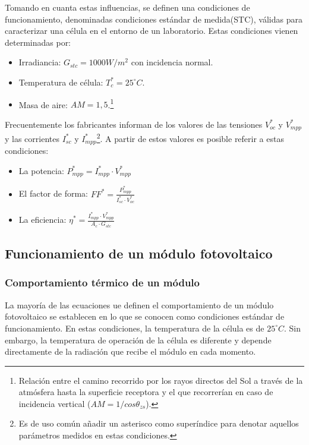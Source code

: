 Tomando en cuanta estas influencias, se definen una condiciones de funcionamiento, denominadas condiciones estándar de medida(STC), válidas para caracterizar una célula en el entorno de un laboratorio. Estas condiciones vienen determinadas por:
\begin{itemize}
\item Irradiancia: \(G_{stc}=1000W/m^2\) con incidencia normal.
\item Temperatura de célula: \(T_c^*=25^\circ C\).
\item Masa de aire: \(AM=1,5\).\footnote{Relación entre el camino recorrido por los rayos directos del Sol a través de la atmósfera hasta la superficie receptora y el que recorrerían en caso de incidencia vertical (\(AM=1/cos\theta_{zs}\)).}
\end{itemize}
Frecuentemente los fabricantes informan de los valores de las tensiones \(V_{oc}^*\) y \(V_{mpp}^*\) y las corrientes \(I_{sc}^*\) y \(I_{mpp}^*\)\footnote{Es de uso común añadir un asterisco como superíndice para denotar aquellos parámetros medidos en estas condiciones.}. A partir de estos valores es posible referir a estas condiciones:
\begin{itemize}
\item La potencia: \(P_{mpp}^*=I_{mpp}^*\cdot V_{mpp}^*\)
\item El factor de forma: \(FF^*=\frac{P_{mpp}^*}{I_{sc}^*\cdot V_{oc}^*}\)
\item La eficiencia: \(\eta^*=\frac{I_{mpp}^*\cdot V_{mpp}^*}{A_c\cdot G_{stc}}\)
\end{itemize}

\subsection{Funcionamiento de un módulo fotovoltaico}
\label{sec:org1d0debf}
\label{subsec:funcionamiento-modulo-fotovoltaico}
\subsubsection{Comportamiento térmico de un módulo}
\label{sec:orgf3f3d7a}
La mayoría de las ecuaciones ue definen el comportamiento de un módulo fotovoltaico se establecen en lo que se conocen como condiciones estándar de funcionamiento. En estas condiciones, la temperatura de la célula es de \(25^\circ C\). Sin embargo, la temperatura de operación de la célula es diferente y depende directamente de la radiación que recibe el módulo en cada momento.

